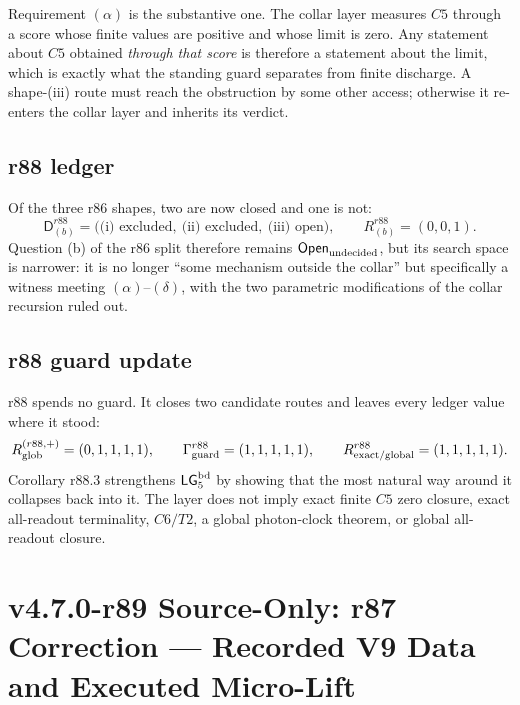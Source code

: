 Requirement \((\alpha)\) is the substantive one.  The collar layer measures \(C5\) through a
score whose finite values are positive and whose limit is zero.  Any statement about \(C5\)
obtained \emph{through that score} is therefore a statement about the limit, which is exactly
what the standing guard separates from finite discharge.  A shape-(iii) route must reach the
obstruction by some other access; otherwise it re-enters the collar layer and inherits its
verdict.

\subsection*{r88 ledger}
\label{subsec:r88-ledger}

Of the three r86 shapes, two are now closed and one is not:
\[
\mathsf D_{(b)}^{r88}
=\bigl(\text{(i) excluded},\ \text{(ii) excluded},\ \text{(iii) open}\bigr),
\qquad
R_{(b)}^{r88}=(0,0,1).
\]
Question (b) of the r86 split therefore remains \(\mathsf{Open}_{\rm undecided}\), but its
search space is narrower: it is no longer ``some mechanism outside the collar'' but
specifically a witness meeting \((\alpha)\)--\((\delta)\), with the two parametric
modifications of the collar recursion ruled out.

\subsection*{r88 guard update}
\label{subsec:r88-guard-update}

r88 spends no guard.  It closes two candidate routes and leaves every ledger value where it
stood:
\[
R_{\rm glob}^{(r88,+)}=(0,1,1,1,1),
\qquad
\Gamma_{\rm guard}^{r88}=(1,1,1,1,1),
\qquad
R_{\rm exact/global}^{r88}=(1,1,1,1,1).
\]
Corollary r88.3 strengthens \(\mathsf{LG}_5^{\rm bd}\) by showing that the most natural way
around it collapses back into it.  The layer does not imply exact
finite \(C5\) zero closure, exact all-readout terminality, \(C6/T2\), a global
photon-clock theorem, or global all-readout closure.


\clearpage
\section*{v4.7.0-r89 Source-Only: r87 Correction --- Recorded V9 Data and Executed Micro-Lift}
\label{sec:r89-r87-correction}


